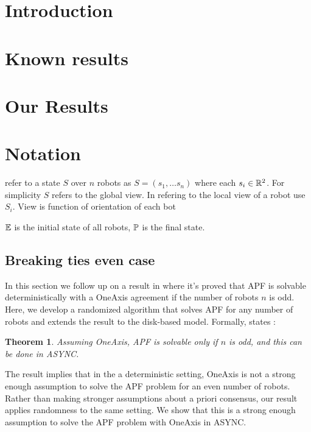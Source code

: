 \documentclass[preprint,10pt]{elsarticle}
\newtheorem{theorem}{Theorem}
\begin{document}

\section{Introduction}
\label{}

\section{Known results}
\label{}

\section{Our Results}
\label{}


\section{Notation} 
refer to a state $S$ over $n$ robots as $S = (s_1, \ldots s_n)$ where each $s_i \in \mathbb{R}^2$. For simplicity
$S$ refers to the global view. In refering to the local view of a robot use $S_i$. View is function of orientation
of each bot



$\mathbb{E}$ is the initial state of all robots, $\mathbb{P}$ is the final state.

\subsection{Breaking ties even case } 
	In this section we follow up on a result in \cite{flocchini12distrib} where it's proved that
	APF is solvable deterministically with a OneAxis agreement if the number of robots $n$ is
	odd. Here, we develop a randomized algorithm that solves APF for any number of robots
	and extends the result to the disk-based model. Formally, \cite{flocchini12distrib} states :
	\begin{theorem} 
		Assuming OneAxis, APF is solvable only if $n$ is odd, and this can be done in ASYNC.
	\end{theorem} 

	The result implies that in the a deterministic setting, OneAxis is not a strong enough 
	assumption to solve the APF problem for an even number of robots. Rather than making 
	stronger assumptions about a priori consensus, our result applies randomness to the same setting. 
	We show that this is a strong enough assumption to solve the 
	APF problem with OneAxis in ASYNC. 
\end{document}
